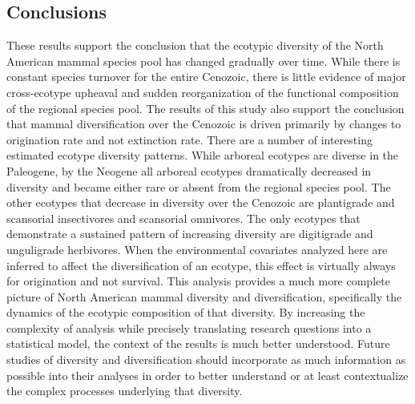 \documentclass[12pt,letterpaper]{article}
\begin{document}
\subsection*{Conclusions}

These results support the conclusion that the ecotypic diversity of the North American mammal species pool has changed gradually over time. While there is constant species turnover for the entire Cenozoic, there is little evidence of major cross-ecotype upheaval and sudden reorganization of the functional composition of the regional species pool. The results of this study also support the conclusion that mammal diversification over the Cenozoic is driven primarily by changes to origination rate and not extinction rate. There are a number of interesting estimated ecotype diversity patterns. While arboreal ecotypes are diverse in the Paleogene, by the Neogene all arboreal ecotypes dramatically decreased in diversity and became either rare or absent from the regional species pool. The other ecotypes that decrease in diversity over the Cenozoic are plantigrade and scansorial insectivores and scansorial omnivores. The only ecotypes that demonstrate a sustained pattern of increasing diversity are digitigrade and unguligrade herbivores. When the environmental covariates analyzed here are inferred to affect the diversification of an ecotype, this effect is virtually always for origination and not survival. This analysis provides a much more complete picture of North American mammal diversity and diversification, specifically the dynamics of the ecotypic composition of that diversity. By increasing the complexity of analysis while precisely translating research questions into a statistical model, the context of the results is much better understood. Future studies of diversity and diversification should incorporate as much information as possible into their analyses in order to better understand or at least contextualize the complex processes underlying that diversity.
\end{document}
